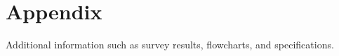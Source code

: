 \chapter*{Appendix}
Additional information such as survey results, flowcharts, and specifications.

